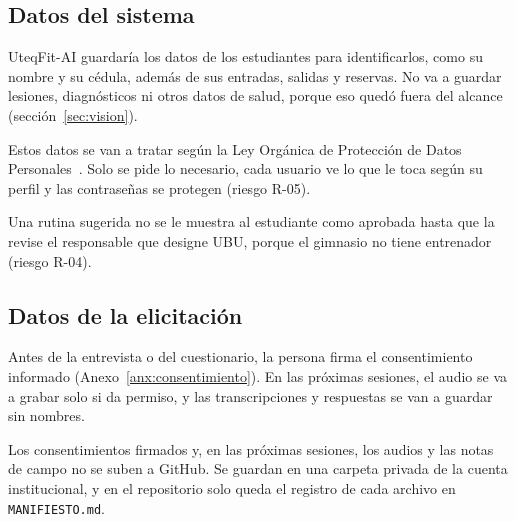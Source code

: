 \subsection{Datos del sistema}

UteqFit-AI guardaría los datos de los estudiantes para identificarlos, como su nombre y su cédula, además de sus entradas, salidas y reservas. No va a guardar lesiones, diagnósticos ni otros datos de salud, porque eso quedó fuera del alcance (sección~\ref{sec:vision}).

Estos datos se van a tratar según la Ley Orgánica de Protección de Datos Personales~\cite{lopdp2021}. Solo se pide lo necesario, cada usuario ve lo que le toca según su perfil y las contraseñas se protegen (riesgo R-05).

Una rutina sugerida no se le muestra al estudiante como aprobada hasta que la revise el responsable que designe UBU, porque el gimnasio no tiene entrenador (riesgo R-04).

\subsection{Datos de la elicitación}

Antes de la entrevista o del cuestionario, la persona firma el consentimiento informado (Anexo~\ref{anx:consentimiento}). En las próximas sesiones, el audio se va a grabar solo si da permiso, y las transcripciones y respuestas se van a guardar sin nombres.

Los consentimientos firmados y, en las próximas sesiones, los audios y las notas de campo no se suben a GitHub. Se guardan en una carpeta privada de la cuenta institucional, y en el repositorio solo queda el registro de cada archivo en \texttt{MANIFIESTO.md}.
